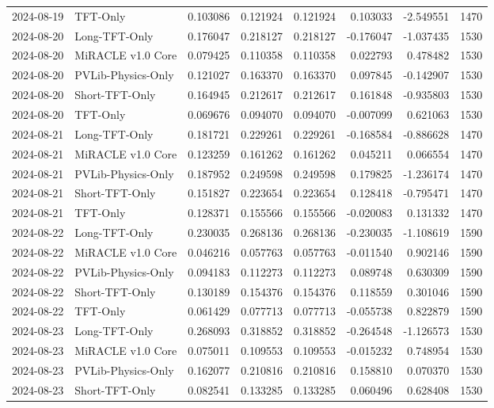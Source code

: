 \begin{tabular}{llrrrrrr}
2024-08-19 & TFT-Only & 0.103086 & 0.121924 & 0.121924 & 0.103033 & -2.549551 & 1470 \\
2024-08-20 & Long-TFT-Only & 0.176047 & 0.218127 & 0.218127 & -0.176047 & -1.037435 & 1530 \\
2024-08-20 & MiRACLE v1.0 Core & 0.079425 & 0.110358 & 0.110358 & 0.022793 & 0.478482 & 1530 \\
2024-08-20 & PVLib-Physics-Only & 0.121027 & 0.163370 & 0.163370 & 0.097845 & -0.142907 & 1530 \\
2024-08-20 & Short-TFT-Only & 0.164945 & 0.212617 & 0.212617 & 0.161848 & -0.935803 & 1530 \\
2024-08-20 & TFT-Only & 0.069676 & 0.094070 & 0.094070 & -0.007099 & 0.621063 & 1530 \\
2024-08-21 & Long-TFT-Only & 0.181721 & 0.229261 & 0.229261 & -0.168584 & -0.886628 & 1470 \\
2024-08-21 & MiRACLE v1.0 Core & 0.123259 & 0.161262 & 0.161262 & 0.045211 & 0.066554 & 1470 \\
2024-08-21 & PVLib-Physics-Only & 0.187952 & 0.249598 & 0.249598 & 0.179825 & -1.236174 & 1470 \\
2024-08-21 & Short-TFT-Only & 0.151827 & 0.223654 & 0.223654 & 0.128418 & -0.795471 & 1470 \\
2024-08-21 & TFT-Only & 0.128371 & 0.155566 & 0.155566 & -0.020083 & 0.131332 & 1470 \\
2024-08-22 & Long-TFT-Only & 0.230035 & 0.268136 & 0.268136 & -0.230035 & -1.108619 & 1590 \\
2024-08-22 & MiRACLE v1.0 Core & 0.046216 & 0.057763 & 0.057763 & -0.011540 & 0.902146 & 1590 \\
2024-08-22 & PVLib-Physics-Only & 0.094183 & 0.112273 & 0.112273 & 0.089748 & 0.630309 & 1590 \\
2024-08-22 & Short-TFT-Only & 0.130189 & 0.154376 & 0.154376 & 0.118559 & 0.301046 & 1590 \\
2024-08-22 & TFT-Only & 0.061429 & 0.077713 & 0.077713 & -0.055738 & 0.822879 & 1590 \\
2024-08-23 & Long-TFT-Only & 0.268093 & 0.318852 & 0.318852 & -0.264548 & -1.126573 & 1530 \\
2024-08-23 & MiRACLE v1.0 Core & 0.075011 & 0.109553 & 0.109553 & -0.015232 & 0.748954 & 1530 \\
2024-08-23 & PVLib-Physics-Only & 0.162077 & 0.210816 & 0.210816 & 0.158810 & 0.070370 & 1530 \\
2024-08-23 & Short-TFT-Only & 0.082541 & 0.133285 & 0.133285 & 0.060496 & 0.628408 & 1530 \\

\end{tabular}
